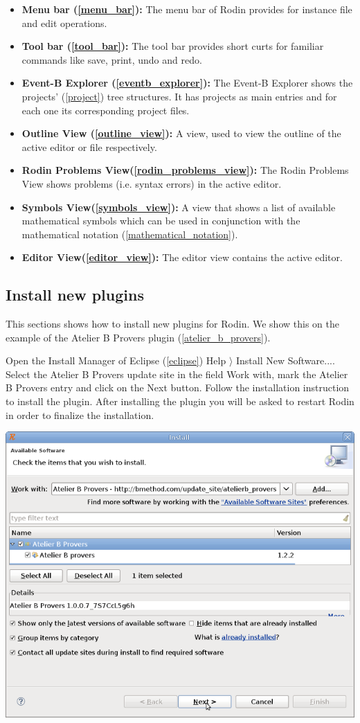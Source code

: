 \begin{itemize}
	\item \textbf{Menu bar (\ref{menu_bar}):} The menu bar of Rodin provides for instance file and edit operations.
	\item \textbf{Tool bar (\ref{tool_bar}):} The tool bar provides short curts for familiar commands like save, print, undo and redo.
	\item \textbf{Event-B Explorer (\ref{eventb_explorer}):} The Event-B Explorer shows the projects' (\ref{project}) tree structures. It has projects as main entries and for each one its corresponding project files.
	\item \textbf{Outline View (\ref{outline_view}):} A view, used to view the outline of the active editor or file respectively.
	\item \textbf{Rodin Problems View(\ref{rodin_problems_view}):} The Rodin Problems View shows problems (i.e. syntax errors) in the active editor.
	\item \textbf{Symbols View(\ref{symbols_view}):} A view that shows a list of available mathematical symbols which can be used in conjunction with the mathematical notation (\ref{mathematical_notation}).
	\item \textbf{Editor View(\ref{editor_view}):} The editor view contains the active editor.
\end{itemize}

\subsection{Install new plugins}

This sections shows how to install new plugins for Rodin. We show this on the example of the Atelier B Provers plugin (\ref{atelier_b_provers}). 

Open the Install Manager of Eclipse (\ref{eclipse}) \textsf{Help $\rangle$ Install New Software...}. Select the Atelier B Provers update site in the field \textsf{Work with}, mark the Atelier B Provers entry and click on the \textsf{Next} button. Follow the installation instruction to install the plugin. After installing the plugin you will be asked to restart Rodin in order to finalize the installation.

\begin{center}
	\includegraphics{img/tutorial/install4.png}
\end{center}
